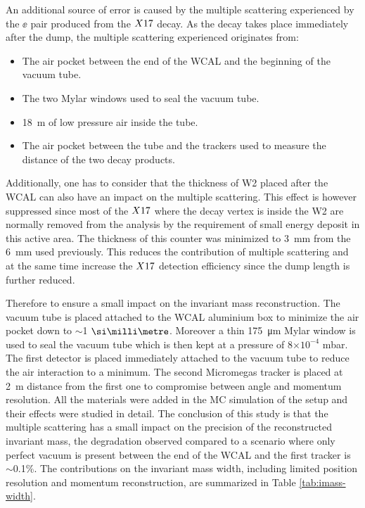 An additional source of error is caused by the multiple scattering experienced by the $\ee$ pair produced from the $X17$ decay. As the decay takes place immediately after the dump, the multiple scattering experienced originates from:

\begin{itemize}
\item The air pocket between the end of the WCAL and the beginning of the vacuum tube.
\item The two Mylar windows used to seal the vacuum tube.
\item \SI{18}{\meter} of low pressure air inside the tube.
\item The air pocket between the tube and the trackers used to measure the distance of the two decay products.
\end{itemize}

Additionally, one has to consider that the thickness of W2 placed after the WCAL can also have an impact on the multiple scattering. This effect is however suppressed since most of the $X17$ where the decay vertex is inside the W2 are normally removed from the analysis by the requirement of small energy deposit in this active area. The thickness of this counter was minimized to \SI{3}{\milli\meter} from the \SI{6}{\milli\meter} used previously. This reduces the contribution of multiple scattering and at the same time increase the $X17$ detection efficiency since the dump length is further reduced.

Therefore to ensure a small impact on the invariant mass reconstruction. The vacuum tube is placed attached to the WCAL aluminium box to minimize the air pocket down to $\sim$1 $\mmi$. Moreover a thin \SI{175}{\micro\meter} Mylar window is used to seal the vacuum tube which is then kept at a pressure of 8$\times 10^{-4}$ \si{\milli\bar}. The first detector is placed immediately attached to the vacuum tube to reduce the air interaction to a minimum. The second Micromegas tracker is placed at \SI{2}{\meter} distance from the first one to compromise between angle and momentum resolution. All the materials were added in the MC simulation of the setup and their effects were studied in detail. The conclusion of this study is that the multiple scattering has a small impact on the precision of the reconstructed invariant mass, the degradation observed compared to a scenario where only perfect vacuum is present between the end of the WCAL and the first tracker is $\sim$0.1\%. The contributions on the invariant mass width, including limited position resolution and momentum reconstruction, are summarized in Table \ref{tab:imass-width}.

